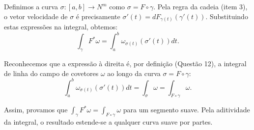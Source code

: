 {	Definimos a curva $\sigma : [a,b] \to N^m$ como $\sigma = F \circ \gamma$. Pela regra da cadeia (item 3), o vetor velocidade de $\sigma$ é precisamente $\sigma'(t) = dF_{\gamma(t)}(\gamma'(t))$. Substituindo estas expressões na integral, obtemos:
	\begin{equation*}
		\int_{\gamma} F^* \omega = \int_a^b \omega_{\sigma(t)}(\sigma'(t)) dt.
	\end{equation*}
	
	Reconhecemos que a expressão à direita é, por definição (Questão 12), a integral de linha do campo de covetores $\omega$ ao longo da curva $\sigma = F \circ \gamma$:
	\begin{equation*}
		\int_a^b \omega_{\sigma(t)}(\sigma'(t)) dt = \int_{\sigma} \omega = \int_{F \circ \gamma} \omega.
	\end{equation*}
	
	Assim, provamos que $\int_{\gamma} F^* \omega = \int_{F \circ \gamma} \omega$ para um segmento suave. Pela aditividade da integral, o resultado estende-se a qualquer curva suave por partes.
}


